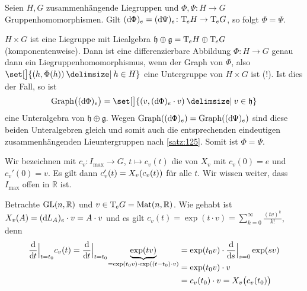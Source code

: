 \begin{korollar}[label=kor:126,{name=[gleiche induzierte Liealgebrenhom. implizieren Gleichheit der Liegruppenhom.]}]
	Seien $H,G$ zusammenhängende Liegruppen und $\Phi, \Psi \colon H \to G$ Gruppenhomomorphismen.
	Gilt $(\mathd \Phi)_e = (\mathd \Psi)_e \colon \Tmap_e H \to \Tmap_e G$, so folgt $\Phi = \Psi$.
\end{korollar}
\begin{beweis}
	$H \times G$ ist eine Liegruppe mit Liealgebra $\mathfrak{h} \oplus \mathfrak{g}= \Tmap_e H \oplus \Tmap_e G$ (komponentenweise).
	Dann ist eine differenzierbare Abbildung $\Phi \colon H \to G$ genau dann ein Liegruppenhomomorphismus, wenn der Graph von $\Phi$, also $\set[\big]{(h,\Phi(h)) \given h \in H}$ eine Untergruppe von $H \times G $ ist (!).
	Ist dies der Fall, so ist 
	\[
		\Graph \enbrace[\big]{(\mathd \Phi)_e} = \set[\big]{ \enbrace*{v, (\mathd \Phi)_e \cdot v} \given v \in \mathfrak{h}}
	\]
	eine Unteralgebra von $\mathfrak{h} \oplus \mathfrak{g}$.
	Wegen $\Graph \enbrace*{(\mathd \Phi)_e} = \Graph \enbrace*{(\mathd \Psi)_e}$ sind diese beiden Unteralgebren gleich und somit auch die entsprechenden eindeutigen zusammenhängenden Lieuntergruppen nach \autoref{satz:125}.
	Somit ist $\Phi =\Psi$.
\end{beweis}

Wir bezeichnen mit $c_v \colon I_{\max} \to G$, $t \mapsto c_v(t)$ die  von $X_v$ mit $c_v(0)=e$ und $c_v'(0)=v$.
Es gilt dann $c_v'(t) = X_v \enbrace*{c_v(t)}$ für alle $t$.
Wir wissen weiter, dass $I_{\max}$ offen in $\mathbb{R}$ ist.

\begin{beispiel*}[{name=[{maximale Integralkurve in der allgemeinen linearen Gruppe}]}]
	Betrachte $\GL(n,\mathbb{R})$ und $v \in \Tmap_e G = \Mat(n,\mathbb{R})$.
	Wie gehabt ist $X_v(A) = (\mathd L_A)_e \cdot v = A \cdot v$ und es gilt $c_v(t)= \exp(t \cdot v) = \sum_{k=0}^{\infty} \frac{(tv)^k}{k!}$, denn
	\begin{align}
		\diffd{}{t}\Big|_{t=t_0} c_v(t) = \diffd{}{t}\Big|_{t=t_0} \Underbrace{\exp(t v)}{=\exp(t_0 v) \cdot \exp((t-t_0) \cdot v)} 
		&= \exp(t_0 v) \cdot \diffd{}{s}\Big|_{s=0} \exp(s v) \\[-1em]
		&= \exp(t_0 v) \cdot v \\
		&= c_v(t_0) \cdot v = X_v \enbrace[\big]{c_v(t_0)}
	\end{align}
\end{beispiel*}


